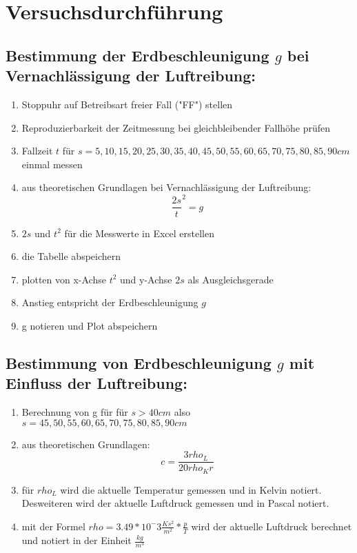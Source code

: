 \documentclass{protokoll}
\begin{document}
\section{Versuchsdurchführung}


\subsection{Bestimmung der Erdbeschleunigung $g$ bei Vernachlässigung der Luftreibung:}


\begin{enumerate}
\item Stoppuhr auf Betreibsart freier Fall ("FF") stellen
\item Reproduzierbarkeit der Zeitmessung bei gleichbleibender Fallhöhe prüfen
\item Fallzeit $t$ für $ s = 5, 10, 15, 20, 25, 30, 35, 40, 45, 50, 55, 60, 
65, 70, 75, 80, 85, 90 cm $ einmal messen
\item aus theoretischen Grundlagen bei Vernachlässigung der Luftreibung:
\begin{equation}
 \frac{2s}{t}^2 = g 
\end{equation}
\item $2s$ und $t^2$ für die Messwerte in Excel erstellen
\item die Tabelle abspeichern
\item plotten von x-Achse $t^2$ und y-Achse $2s$ als Ausgleichsgerade
\item Anstieg entspricht der Erdbeschleunigung $g$
\item g notieren und Plot abspeichern
\end{enumerate}


\subsection{Bestimmung von Erdbeschleunigung $g$ mit Einfluss der Luftreibung:}


\begin{enumerate}
\item Berechnung von g für für $s > 40cm$ also $s = 45, 50, 55, 60, 65, 70, 75, 80, 85, 
90cm $
\item aus theoretischen Grundlagen:
\begin{equation}
c = \frac{3 rho_L}{20 rho_K r}
\end{equation}
\item für $ rho_L $ wird die aktuelle Temperatur gemessen und in Kelvin notiert.
Desweiteren wird der aktuelle Luftdruck gemessen und in Pascal notiert.
\item mit der Formel $ rho = 3.49 * 10^-3 \frac{Ks^2}{m^2} * 
\frac{p}{T} $ wird der aktuelle Luftdruck berechnet
und notiert in der Einheit $\frac{kg}{m^3}$
\end{enumerate}
\end{document}
